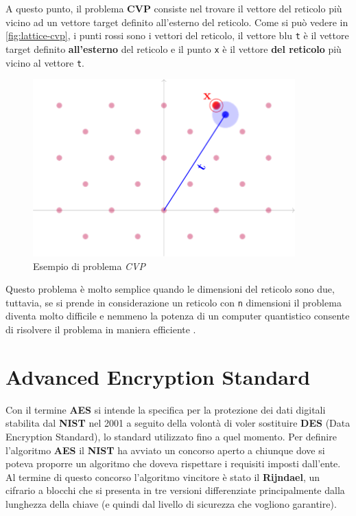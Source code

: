 A questo punto, il problema \textbf{CVP} consiste nel trovare il vettore del reticolo più vicino ad un vettore target definito all'esterno del reticolo. Come si può vedere in \autoref{fig:lattice-cvp}, i punti rossi sono i vettori del reticolo, il vettore blu \texttt{t} è il vettore target definito \textbf{all'esterno} del reticolo e il punto \texttt{x} è il vettore \textbf{del reticolo} più vicino al vettore \texttt{t}. \cite{telsy_lattice}

\begin{figure}[h]
    \centering
    \includegraphics[width=0.9\textwidth]{capitoli/figure-crittografia/lattice-cvp.png}
    \caption{Esempio di problema \emph{CVP}}
    \label{fig:lattice-cvp}
\end{figure}

Questo problema è molto semplice quando le dimensioni del reticolo sono due, tuttavia, se si prende in considerazione un reticolo con \texttt{n} dimensioni il problema diventa molto difficile e nemmeno la potenza di un computer quantistico consente di risolvere il problema in maniera efficiente \cite{hwupgrade_kyber}.

\section{Advanced Encryption Standard}
Con il termine \textbf{AES} si intende la specifica per la protezione dei dati digitali stabilita dal \textbf{NIST} nel 2001 a seguito della volontà di voler sostituire \textbf{DES} (Data Encryption Standard), lo standard utilizzato fino a quel momento. Per definire l'algoritmo \textbf{AES} il \textbf{NIST} ha avviato un concorso aperto a chiunque dove si poteva proporre un algoritmo che doveva rispettare i requisiti imposti dall'ente. Al termine di questo concorso l'algoritmo vincitore è stato il \textbf{Rijndael}, un cifrario a blocchi che si presenta in tre versioni differenziate principalmente dalla lunghezza della chiave (e quindi dal livello di sicurezza che vogliono garantire).

